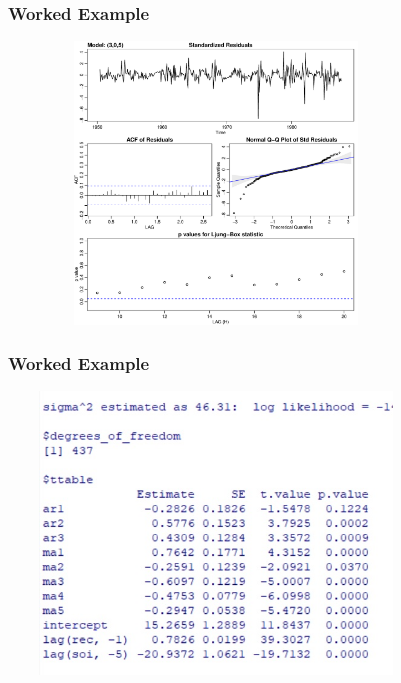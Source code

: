 \documentclass[%
xcolor=pdftex]{beamer}
\begin{document}
\begin{frame}
\frametitle{Worked Example}

\includegraphics[width=110mm, height=75mm]{diag2.pdf}


\end{frame}

\begin{frame}
\frametitle{Worked Example}

\includegraphics[width=110mm, height=75mm]{lagreg.jpg}



\end{frame}
\end{document}
